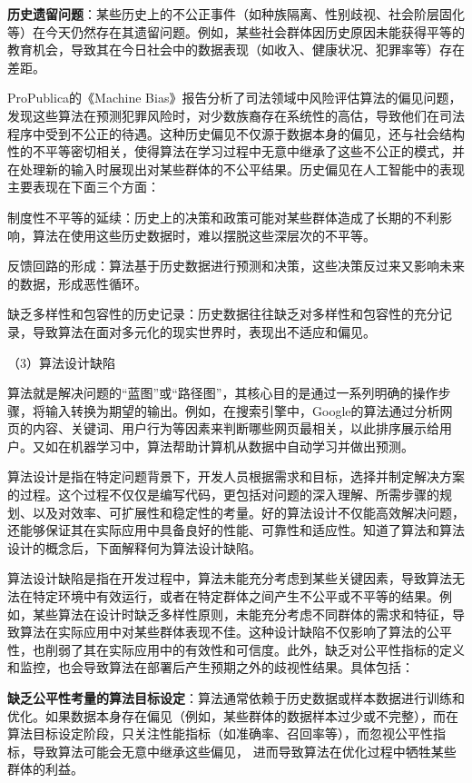 \textbf{历史遗留问题}：某些历史上的不公正事件（如种族隔离、性别歧视、社会阶层固化等）在今天仍然存在其遗留问题。例如，某些社会群体因历史原因未能获得平等的教育机会，导致其在今日社会中的数据表现（如收入、健康状况、犯罪率等）存在差距。

ProPublica的《Machine Bias》报告分析了司法领域中风险评估算法的偏见问题，发现这些算法在预测犯罪风险时，对少数族裔存在系统性的高估，导致他们在司法程序中受到不公正的待遇。这种历史偏见不仅源于数据本身的偏见，还与社会结构性的不平等密切相关，使得算法在学习过程中无意中继承了这些不公正的模式，并在处理新的输入时展现出对某些群体的不公平结果。历史偏见在人工智能中的表现主要表现在下面三个方面：

制度性不平等的延续：历史上的决策和政策可能对某些群体造成了长期的不利影响，算法在使用这些历史数据时，难以摆脱这些深层次的不平等。

反馈回路的形成：算法基于历史数据进行预测和决策，这些决策反过来又影响未来的数据，形成恶性循环。

缺乏多样性和包容性的历史记录：历史数据往往缺乏对多样性和包容性的充分记录，导致算法在面对多元化的现实世界时，表现出不适应和偏见。

（3）算法设计缺陷

算法就是解决问题的“蓝图”或“路径图”，其核心目的是通过一系列明确的操作步骤，将输入转换为期望的输出。例如，在搜索引擎中，Google的算法通过分析网页的内容、关键词、用户行为等因素来判断哪些网页最相关，以此排序展示给用户。又如在机器学习中，算法帮助计算机从数据中自动学习并做出预测。

算法设计是指在特定问题背景下，开发人员根据需求和目标，选择并制定解决方案的过程。这个过程不仅仅是编写代码，更包括对问题的深入理解、所需步骤的规划、以及对效率、可扩展性和稳定性的考量。好的算法设计不仅能高效解决问题，还能够保证其在实际应用中具备良好的性能、可靠性和适应性。知道了算法和算法设计的概念后，下面解释何为算法设计缺陷。

算法设计缺陷是指在开发过程中，算法未能充分考虑到某些关键因素，导致算法无法在特定环境中有效运行，或者在特定群体之间产生不公平或不平等的结果。例如，某些算法在设计时缺乏多样性原则，未能充分考虑不同群体的需求和特征，导致算法在实际应用中对某些群体表现不佳。这种设计缺陷不仅影响了算法的公平性，也削弱了其在实际应用中的有效性和可信度。此外，缺乏对公平性指标的定义和监控，也会导致算法在部署后产生预期之外的歧视性结果。具体包括：

\textbf{缺乏公平性考量的算法目标设定}：算法通常依赖于历史数据或样本数据进行训练和优化。如果数据本身存在偏见（例如，某些群体的数据样本过少或不完整），而在算法目标设定阶段，只关注性能指标（如准确率、召回率等），而忽视公平性指标，导致算法可能会无意中继承这些偏见， 进而导致算法在优化过程中牺牲某些群体的利益。

